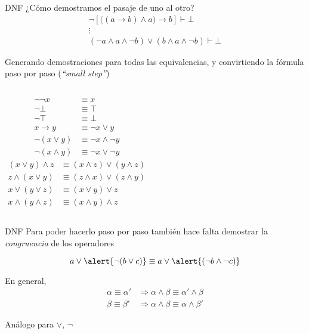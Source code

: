 \documentclass{beamer}
\begin{document}
\begin{frame}{DNF}
    ¿Cómo demostramos el pasaje de uno al otro?
    \begin{gather*}
        \neg [ \big( (a \to b) \wedge a \big) \to b ] \vdash \bot\\
        \vdots\\
        (\neg a \wedge a \wedge \neg b) \vee (b \wedge a \wedge \neg b) \vdash \bot
    \end{gather*}

    Generando demostraciones para todas las equivalencias, y convirtiendo la fórmula paso por paso (\textit{``small step''})
    \begin{columns}
        \begin{align*}
        \neg\neg x &\equiv x\\
        \neg \bot &\equiv \top\\
        \neg \top &\equiv \bot\\
        x \to y &\equiv \neg x \vee y\\
        \neg(x \vee y) &\equiv \neg x \wedge \neg y\\
        \neg(x \wedge y) &\equiv \neg x \vee \neg y
    \end{align*}
        \begin{align*}
            (x \vee y) \wedge z &\equiv (x \wedge z) \vee (y \wedge z)\\
            z \wedge (x \vee y) &\equiv (z \wedge x) \vee (z \wedge y)\\
            x \vee (y \vee z) &\equiv (x \vee y) \vee z\\
            x \wedge (y \wedge z) &\equiv (x \wedge y) \wedge z
        \end{align*}
    \end{columns}
\end{frame}

\begin{frame}{DNF}
    Para poder hacerlo paso por paso también hace falta demostrar la \textit{congruencia} de los operadores

    \[
        a \vee \alert{\neg (b \vee c)}
        \equiv
        a \vee \alert{(\neg b \wedge \neg c)}
    \]

    En general,
    \begin{align*}
        \alpha \equiv \alpha' &\Rightarrow \alpha \wedge \beta \equiv \alpha' \wedge \beta\\
        \beta \equiv \beta' &\Rightarrow \alpha \wedge \beta \equiv \alpha \wedge \beta'
    \end{align*}

    Análogo para $\vee$, $\neg$
\end{frame}
\end{document}
